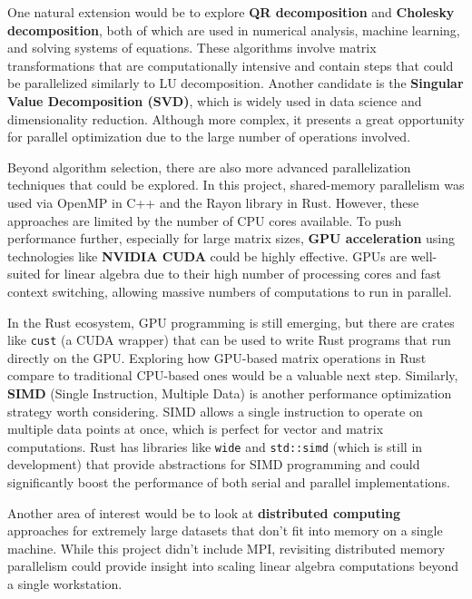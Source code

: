 \documentclass[12pt]{article}
\begin{document}
\vspace{1em}


One natural extension would be to explore \textbf{QR decomposition} and \textbf{Cholesky decomposition}, both of which are used in numerical analysis,
machine learning, and solving systems of equations. These algorithms involve matrix transformations that are computationally intensive and contain
steps that could be parallelized similarly to LU decomposition. Another candidate is the \textbf{Singular Value Decomposition (SVD)}, which is widely
used in data science and dimensionality reduction. Although more complex, it presents a great opportunity for parallel optimization due to the large number
of operations involved.

\vspace{1em}

Beyond algorithm selection, there are also more advanced parallelization techniques that could be explored. In this project, shared-memory
parallelism was used via OpenMP in C++ and the Rayon library in Rust. However, these approaches are limited by the number of CPU cores available.
To push performance further, especially for large matrix sizes, \textbf{GPU acceleration} using technologies like \textbf{NVIDIA CUDA} could be
highly effective. GPUs are well-suited for linear algebra due to their high number of processing cores and fast context switching, allowing massive
numbers of computations to run in parallel.

\vspace{1em}

In the Rust ecosystem, GPU programming is still emerging, but there are crates like \texttt{cust} (a CUDA wrapper) that can be used to write Rust
programs that run directly on the GPU. Exploring how GPU-based matrix operations in Rust compare to traditional CPU-based ones would be a valuable
next step. Similarly, \textbf{SIMD} (Single Instruction, Multiple Data) is another performance optimization strategy worth considering. SIMD allows
a single instruction to operate on multiple data points at once, which is perfect for vector and matrix computations. Rust has libraries like
\texttt{wide} and \texttt{std::simd} (which is still in development) that provide abstractions for SIMD programming and could significantly boost the
performance of both serial and parallel implementations.

\vspace{1em}

Another area of interest would be to look at \textbf{distributed computing} approaches for extremely large datasets that don't fit into memory on a
single machine. While this project didn't include MPI, revisiting distributed memory parallelism could provide insight into scaling linear algebra computations beyond a single workstation.
\end{document}
